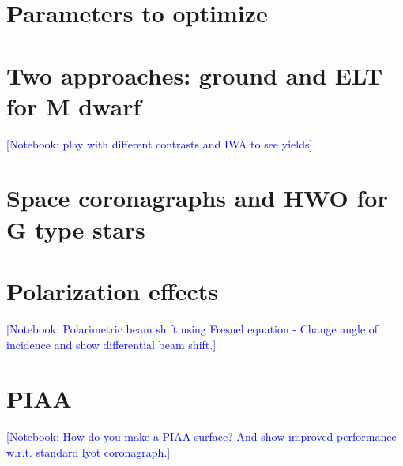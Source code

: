 \documentclass[letterpaper]{ar-1col}
\newcommand{\commentehp}[1]{\textcolor{red}{[EHP: #1]}}
\newcommand{\commentsyh}[1]{\textcolor{red}{[SYH: #1]}}
\newcommand{\notebooksuggestion}[1]{\textcolor{blue}{[Notebook: #1]}}
\begin{document}
%
%
%

%


\section{Parameters to optimize}
\lipsum[2-4]

\section{Two approaches: ground and ELT for M dwarf}

\notebooksuggestion{play with different contrasts and IWA to see yields}

\lipsum[2-4]

\section{Space coronagraphs and HWO for G type stars}
\lipsum[2-4]

\section{Polarization effects} 
\notebooksuggestion{Polarimetric beam shift using Fresnel equation - Change angle of incidence and show differential beam shift.}
\lipsum[2-4]

\section{PIAA}
\notebooksuggestion{How do you make a PIAA surface? And show improved performance w.r.t. standard lyot coronagraph.}
\lipsum[2-4]
\end{document}
